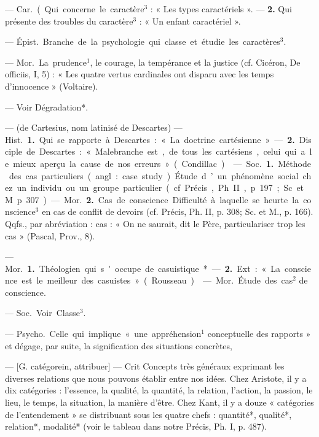 \begin{itemize}[leftmargin=1cm, label=, itemsep=11pt]
 — \si{Car.} (. Qui concerne le
caractère$^3$ : « Les types caractériels ». —  {\bf 2.} Qui présente des troubles
du caractère$^3$ : « Un enfant caractériel ».

 — \si{Épist.} Branche de la
psychologie qui classe et étudie les
caractères$^3$.

 — \si{Mor.} La prudence$^1$, le courage, la tempérance
et la justice (cf. Cicéron, De officiis,
I, 5) : « Les quatre vertus cardinales
ont disparu avec les temps d’innocence » (Voltaire).

 — Voir Dégradation*.

 — (de Cartesius, nom latinisé
de Descartes) — \si{Hist.} {\bf 1.} Qui se
rapporte à Descartes : « La doctrine
cartésienne ». —  {\bf 2.} Disciple de Descartes : « Malebranche est, de tous
les cartésiens, celui qui a le mieux
aperçu la cause de nos erreurs »
(Condillac).

 — \si{Soc.} {\bf 1.} Méthode des cas particuliers (angl. : case study). Étude
d’un phénomène social chez un individu ou un groupe particulier (cf.
Précis, Ph. II, p. 197; Sc. et M.
p. 307). — \si{Mor.}  {\bf 2.} Cas de conscience.
Difficulté à laquelle se heurte la
conscience$^3$ en cas de conflit de
devoirs (cf. Précis, Ph. II, p. 308;
Sc. et M., p. 166). Qqfs., par abréviation : cas : « On ne saurait, dit le
Père, particulariser trop les cas »
(Pascal, Prov., 8).

 — \si{Mor.} {\bf 1.} Théologien qui
s'occupe de casuistique*. —  {\bf 2.} Ext. :
« La conscience est le meilleur des
casuistes » (Rousseau).

 — \si{Mor.} Étude des cas$^2$
de conscience.

 — \si{Soc.} Voir Classe$^3$.

 — \si{Psycho.}
Celle qui implique « une appréhension$^1$ conceptuelle des rapports » et
dégage, par suite, la signification
des situations concrètes,

 — [G. catégorein, attribuer]
— \si{Crit} Concepts très généraux
exprimant les diverses relations que
nous pouvons établir entre nos idées.
Chez Aristote, il y a dix catégories :
l'essence, la qualité, la quantité, la
relation, l’action, la passion, le lieu,
le temps, la situation, la manière
d’être. Chez Kant, il y a douze « catégories de l’entendement » se distribuant sous les quatre chefs : quantité*, qualité*, relation*, modalité*
(voir le tableau dans notre Précis,
Ph. I, p. 487).


\end{itemize}
